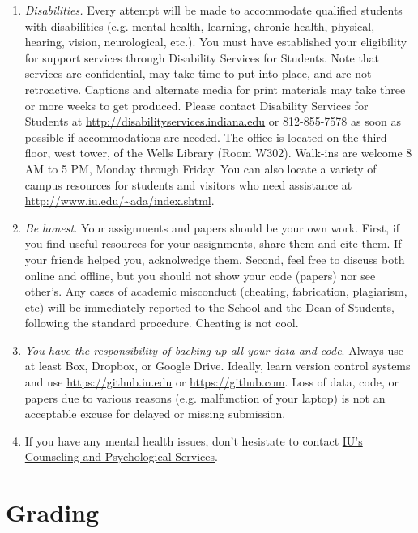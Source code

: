 \documentclass[11pt,article,oneside]{memoir}
\begin{document}
\begin{enumerate}

\item \emph{Disabilities.} Every attempt will be made to accommodate qualified
students with disabilities (e.g. mental health, learning, chronic health,
physical, hearing, vision, neurological, etc.). You must have established your
eligibility for support services through Disability Services for Students. Note
that services are confidential, may take time to put into place, and are not
retroactive.  Captions and alternate media for print materials may take three
or more weeks to get produced. Please contact Disability Services for Students
at \url{http://disabilityservices.indiana.edu} or 812-855-7578 as soon as
possible if accommodations are needed. The office is located on the third
floor, west tower, of the Wells Library (Room W302). Walk-ins are welcome 8 AM
to 5 PM, Monday through Friday. You can also locate a variety of campus
resources for students and visitors who need assistance at
\url{http://www.iu.edu/~ada/index.shtml}. 

\item \emph{Be honest.} Your assignments and papers should be your own work.
First, if you find useful resources for your assignments, share them and cite
them. If your friends helped you, acknolwedge them. Second, feel free to
discuss both online and offline, but you should not show your code (papers) nor
see other's. Any cases of academic misconduct (cheating, fabrication,
plagiarism, etc) will be immediately reported to the School and the Dean of
Students, following the standard procedure. Cheating is not cool. 

\item \emph{You have the responsibility of backing up all your data and code}.
Always use at least Box, Dropbox, or Google Drive. Ideally, learn version
control systems and use \url{https://github.iu.edu} or
\url{https://github.com}. Loss of data, code, or papers due to various reasons
(e.g. malfunction of your laptop) is not an acceptable excuse for delayed or
missing submission. 

\item If you have any mental health issues, don't hesistate to contact
\href{http://jhealthcenter.indiana.edu/counseling/index.shtml}{IU's Counseling
and Psychological Services}. 


\end{enumerate}

\section{Grading}
\label{sec:grading_tentative_}
\end{document}
